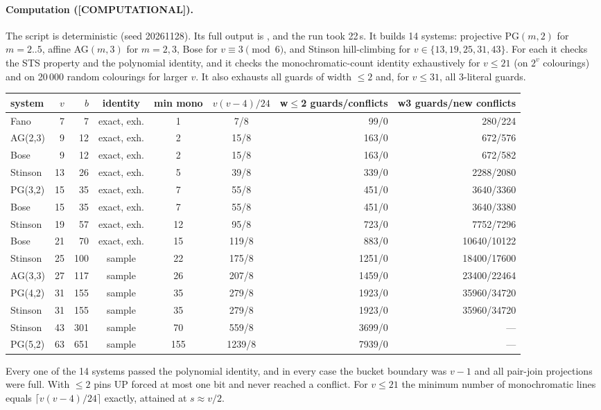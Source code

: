 \documentclass[11pt]{article}
\theoremstyle{definition}
\theoremstyle{remark}
\newcommand{\lab}[1]{\textbf{[#1]}}
\begin{document}
\paragraph{Computation (\lab{COMPUTATIONAL}).}
The script  is deterministic (seed 20261128).
Its full output is , and the run took
22\,s. It builds 14 systems: projective PG$(m,2)$ for $m=2..5$, affine AG$(m,3)$ for
$m=2,3$, Bose for $v\equiv3\pmod6$, and Stinson hill-climbing for $v\in\{13,19,25,31,43\}$.
For each it checks the STS property and the polynomial identity, and it checks the
monochromatic-count identity exhaustively for $v\le21$ (on $2^v$ colourings) and on 20\,000
random colourings for larger $v$. It also exhausts all guards of width $\le2$ and, for
$v\le31$, all 3-literal guards.
\begin{center}\footnotesize
\setlength{\tabcolsep}{4pt}
\begin{tabular}{lrrcccrr}
\toprule
system & $v$ & $b$ & identity & min mono & $v(v-4)/24$ & w$\le$2 guards/conflicts & w3 guards/new conflicts\\
\midrule
Fano & 7 & 7 & exact, exh. & 1 & 7/8 & 99/0 & 280/224\\
AG(2,3) & 9 & 12 & exact, exh. & 2 & 15/8 & 163/0 & 672/576\\
Bose & 9 & 12 & exact, exh. & 2 & 15/8 & 163/0 & 672/582\\
Stinson & 13 & 26 & exact, exh. & 5 & 39/8 & 339/0 & 2288/2080\\
PG(3,2) & 15 & 35 & exact, exh. & 7 & 55/8 & 451/0 & 3640/3360\\
Bose & 15 & 35 & exact, exh. & 7 & 55/8 & 451/0 & 3640/3380\\
Stinson & 19 & 57 & exact, exh. & 12 & 95/8 & 723/0 & 7752/7296\\
Bose & 21 & 70 & exact, exh. & 15 & 119/8 & 883/0 & 10640/10122\\
Stinson & 25 & 100 & sample & 22 & 175/8 & 1251/0 & 18400/17600\\
AG(3,3) & 27 & 117 & sample & 26 & 207/8 & 1459/0 & 23400/22464\\
PG(4,2) & 31 & 155 & sample & 35 & 279/8 & 1923/0 & 35960/34720\\
Stinson & 31 & 155 & sample & 35 & 279/8 & 1923/0 & 35960/34720\\
Stinson & 43 & 301 & sample & 70 & 559/8 & 3699/0 & ---\\
PG(5,2) & 63 & 651 & sample & 155 & 1239/8 & 7939/0 & ---\\
\bottomrule
\end{tabular}
\end{center}
Every one of the 14 systems passed the polynomial identity, and in every case the bucket
boundary was $v-1$ and all pair-join projections were full. With $\le2$ pins UP forced at
most one bit and never reached a conflict. For $v\le21$ the minimum number of
monochromatic lines equals $\lceil v(v-4)/24\rceil$ exactly, attained at $s\approx v/2$.
\end{document}
